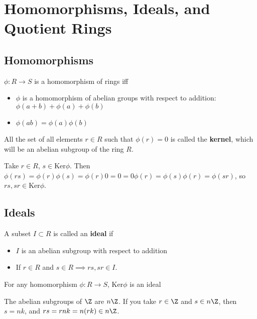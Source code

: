 \documentclass[10pt]{article}
\newcommand{\Ker}{\text{Ker}}
\begin{document}
\section{Homomorphisms, Ideals, and Quotient Rings}
\subsection{Homomorphisms}
\begin{defn}
    $\phi: R \to S$ is a homomorphism of rings iff \begin{itemize}
        \item $\phi$ is a homomorphism of abelian groups with respect to addition: $\phi(a + b) + \phi(a) + \phi(b)$
        \item $\phi(ab) = \phi(a)\phi(b)$
    \end{itemize}
\end{defn}

\begin{defn}
    All the set of all elements $r\in R$ such that $\phi(r) = 0$ is called the \textbf{kernel}, which will be an abelian subgroup of the ring $R$.
\end{defn}

Take $r\in R$, $s\in \Ker\phi$. Then $\phi(rs) = \phi(r)\phi(s) = \phi(r)0 = 0 = 0\phi(r) = \phi(s)\phi(r) = \phi(sr)$, so $rs, sr \in \Ker\phi$.

\subsection{Ideals}
\begin{defn}
    A subset $I \subset R$ is called an \textbf{ideal} if \begin{itemize}
        \item $I$ is an abelian subgroup with respect to addition
        \item If $r\in R$ and $s\in R \implies rs, sr \in I$.
    \end{itemize}
\end{defn}

\begin{cor}
    For any homomorphism $\phi: R\to S$, $\Ker\phi$ is an ideal
\end{cor}

\begin{exm*}
    The abelian subgroups of $\Z$ are $n\Z$. If you take $r \in \Z$ and $s \in n\Z$, then $s = nk$, and $rs = rnk = n(rk) \in n\Z$.
\end{exm*}
\end{document}
